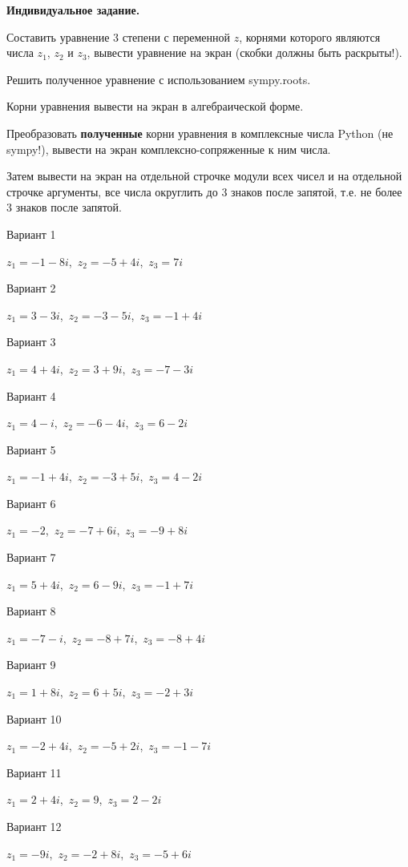 \documentclass[11pt]{report}
\begin{document}
\pagestyle{empty}

{\bf Индивидуальное задание.}


Составить уравнение 3 степени с переменной $z$, корнями которого являются числа $z_1$, $z_2$ и $z_3$,
 вывести уравнение на экран (скобки должны быть раскрыты!).

Решить полученное уравнение с использованием sympy.roots.

Корни уравнения вывести на экран в алгебраической форме.

Преобразовать {\bf полученные} корни уравнения в комплексные числа Python
 (не sympy!), вывести на экран комплексно-сопряженные к ним числа.

Затем вывести на экран на отдельной строчке модули всех чисел
и на отдельной строчке аргументы,
все числа округлить до 3 знаков после запятой,
т.е. не более 3 знаков после запятой.

Вариант 1

$z_1 = -1 - 8 i$,\ $z_2 = -5 + 4 i$,\ $z_3 = 7 i$

Вариант 2

$z_1 = 3 - 3 i$,\ $z_2 = -3 - 5 i$,\ $z_3 = -1 + 4 i$

Вариант 3

$z_1 = 4 + 4 i$,\ $z_2 = 3 + 9 i$,\ $z_3 = -7 - 3 i$

Вариант 4

$z_1 = 4 - i$,\ $z_2 = -6 - 4 i$,\ $z_3 = 6 - 2 i$

Вариант 5

$z_1 = -1 + 4 i$,\ $z_2 = -3 + 5 i$,\ $z_3 = 4 - 2 i$

Вариант 6

$z_1 = -2$,\ $z_2 = -7 + 6 i$,\ $z_3 = -9 + 8 i$

Вариант 7

$z_1 = 5 + 4 i$,\ $z_2 = 6 - 9 i$,\ $z_3 = -1 + 7 i$

Вариант 8

$z_1 = -7 - i$,\ $z_2 = -8 + 7 i$,\ $z_3 = -8 + 4 i$

Вариант 9

$z_1 = 1 + 8 i$,\ $z_2 = 6 + 5 i$,\ $z_3 = -2 + 3 i$

Вариант 10

$z_1 = -2 + 4 i$,\ $z_2 = -5 + 2 i$,\ $z_3 = -1 - 7 i$

Вариант 11

$z_1 = 2 + 4 i$,\ $z_2 = 9$,\ $z_3 = 2 - 2 i$

Вариант 12

$z_1 = - 9 i$,\ $z_2 = -2 + 8 i$,\ $z_3 = -5 + 6 i$
\end{document}
